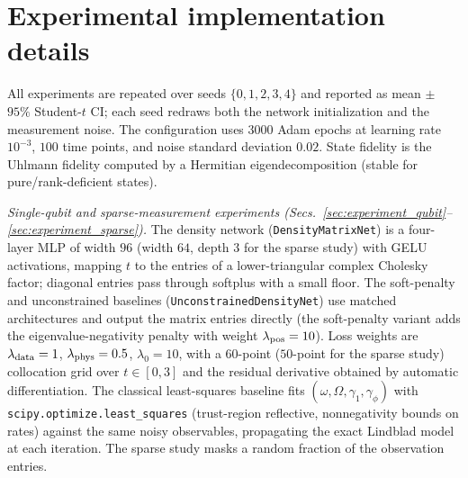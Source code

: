 \documentclass[twocolumn,aps,prxquantum,superscriptaddress,nofootinbib,floatfix,longbibliography]{revtex4-2}
\begin{document}
\section{Experimental implementation details}
\label{sec:appendix_experiments}
All experiments are repeated over seeds $\{0,1,2,3,4\}$ and reported as mean $\pm$ $95\%$ Student-$t$ CI; each seed redraws both the network initialization and the measurement noise. The configuration uses $3000$ Adam epochs at learning rate $10^{-3}$, $100$ time points, and noise standard deviation $0.02$. State fidelity is the Uhlmann fidelity computed by a Hermitian eigendecomposition (stable for pure/rank-deficient states).

\emph{Single-qubit and sparse-measurement experiments (Secs.~\ref{sec:experiment_qubit}--\ref{sec:experiment_sparse}).} The density network (\texttt{DensityMatrixNet}) is a four-layer MLP of width $96$ (width $64$, depth $3$ for the sparse study) with GELU activations, mapping $t$ to the entries of a lower-triangular complex Cholesky factor; diagonal entries pass through softplus with a small floor. The soft-penalty and unconstrained baselines (\texttt{UnconstrainedDensityNet}) use matched architectures and output the matrix entries directly (the soft-penalty variant adds the eigenvalue-negativity penalty with weight $\lambda_{\rm pos}=10$). Loss weights are $\lambda_{\rm data}=1$, $\lambda_{\rm phys}=0.5$, $\lambda_0=10$, with a $60$-point ($50$-point for the sparse study) collocation grid over $t\in[0,3]$ and the residual derivative obtained by automatic differentiation. The classical least-squares baseline fits $(\omega,\Omega,\gamma_1,\gamma_\phi)$ with \texttt{scipy.optimize.least\_squares} (trust-region reflective, nonnegativity bounds on rates) against the same noisy observables, propagating the exact Lindblad model at each iteration. The sparse study masks a random fraction of the observation entries.
\end{document}
